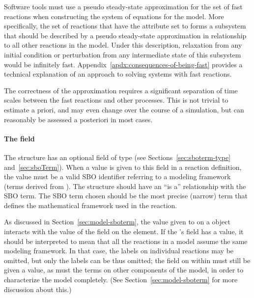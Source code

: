 Software tools must use a pseudo steady-state approximation for
the set of fast reactions when constructing the system of
equations for the model.  More specifically, the set of reactions
that have the  attribute set to  forms a
subsystem that should be described by a pseudo steady-state
approximation in relationship to all other reactions in the model.
Under this description, relaxation from any initial condition or
perturbation from any intermediate state of this subsystem would
be infinitely fast.
Appendix~\ref{apdx:consequences-of-being-fast} provides a
technical explanation of an approach to solving systems with fast
reactions.

The correctness of the approximation requires a significant
separation of time scales between the fast reactions and other
processes.  This is not trivial to estimate a priori, and may even
change over the course of a simulation, but can reasonably be
assessed a posteriori in most cases.


\paragraph{The  field}

The \Reaction structure has an optional  field of
type  (see Sections~\ref{sec:sboterm-type}
and~\ref{sec:sboTerm}).  When a value is given to this field in a
reaction definition, the value must be a valid SBO identifier
referring to a modeling framework (\ie terms derived from
\sboframework).  The \Reaction structure should have an ``is a''
relationship with the SBO term.  The SBO term chosen should be the
most precise (narrow) term that defines the mathematical framework
used in the reaction.

As discussed in Section~\ref{sec:model-sboterm}, the value given
to  on a \Reaction object interacts with the value
of the  field on the \Model element.  If the
\Model's  field has a value, it should be
interpreted to mean that all the reactions in a model assume the
same modeling framework.  In that case, the  labels
on individual reactions may be omitted, but only the \Reaction
{} labels can be thus omitted; the 
field on \KineticLaw within \Reaction must still be given a value,
as must the terms on other components of the model, in order to
characterize the model completely.  (See
Section~\ref{sec:model-sboterm} for more discussion about this.)

